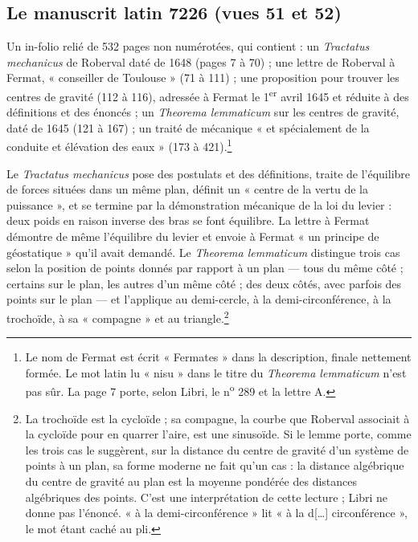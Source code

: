 \documentclass[11pt,a4paper]{article}
\begin{document}
\subsection*{Le manuscrit latin 7226 (vues 51 et 52)}

Un in-folio relié de 532 pages non numérotées, qui contient : un
\emph{Tractatus mechanicus} de Roberval daté de 1648 (pages 7 à 70) ; une
lettre de Roberval à Fermat, « conseiller de Toulouse » (71 à 111) ; une
proposition pour trouver les centres de gravité (112 à 116), adressée à Fermat
le 1\textsuperscript{er} avril 1645 et réduite à des définitions et des
énoncés ; un \emph{Theorema lemmaticum} sur les centres de gravité, daté de
1645 (121 à 167) ; un traité de mécanique « et spécialement de la conduite et
élévation des eaux » (173 à 421).\footnote{Le nom de Fermat est écrit
« Fermates » dans la description, finale nettement formée. Le mot latin lu
« nisu » dans le titre du \emph{Theorema lemmaticum} n'est pas sûr. La page 7
porte, selon Libri, le n\textsuperscript{o} 289 et la lettre A.}

Le \emph{Tractatus mechanicus} pose des postulats et des définitions, traite
de l'équilibre de forces situées dans un même plan, définit un « centre de la
vertu de la puissance », et se termine par la démonstration mécanique de la
loi du levier : deux poids en raison inverse des bras se font équilibre. La
lettre à Fermat démontre de même l'équilibre du levier et envoie à Fermat « un
principe de géostatique » qu'il avait demandé. Le \emph{Theorema lemmaticum}
distingue trois cas selon la position de points donnés par rapport à un plan
— tous du même côté ; certains sur le plan, les autres d'un même côté ; des
deux côtés, avec parfois des points sur le plan — et l'applique au
demi-cercle, à la demi-circonférence, à la trochoïde, à sa « compagne » et au
triangle.\footnote{La trochoïde est la cycloïde ; sa compagne, la courbe que
Roberval associait à la cycloïde pour en quarrer l'aire, est une sinusoïde.
Si le lemme porte, comme les trois cas le suggèrent, sur la distance du centre
de gravité d'un système de points à un plan, sa forme moderne ne fait qu'un
cas : la distance algébrique du centre de gravité au plan est la moyenne
pondérée des distances algébriques des points. C'est une interprétation de
cette lecture ; Libri ne donne pas l'énoncé. « à la demi-circonférence » lit
« à la d[…] circonférence », le mot étant caché au pli.}
\end{document}
